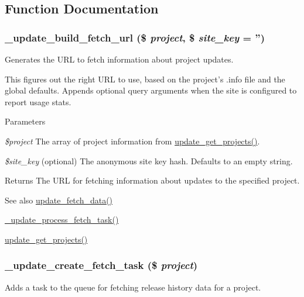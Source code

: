 \subsection{Function Documentation}
\hypertarget{update_8fetch_8inc_a6d937d41a6ccf645109deefae0f6e5d3}{
\subsubsection[{\_\-update\_\-build\_\-fetch\_\-url}]{\setlength{\rightskip}{0pt plus 5cm}\_\-update\_\-build\_\-fetch\_\-url (\$ {\em project}, \/  \$ {\em site\_\-key} = {\ttfamily ''})}}
\label{update_8fetch_8inc_a6d937d41a6ccf645109deefae0f6e5d3}
Generates the URL to fetch information about project updates.

This figures out the right URL to use, based on the project's .info file and the global defaults. Appends optional query arguments when the site is configured to report usage stats.


\begin{DoxyParams}{Parameters}
\item[{\em \$project}]The array of project information from \hyperlink{update_8compare_8inc_a7e1ea49d91f2d2b81b8101d481d10300}{update\_\-get\_\-projects()}. \item[{\em \$site\_\-key}](optional) The anonymous site key hash. Defaults to an empty string.\end{DoxyParams}
\begin{DoxyReturn}{Returns}
The URL for fetching information about updates to the specified project.
\end{DoxyReturn}
\begin{DoxySeeAlso}{See also}
\hyperlink{update_8module_a88528fa85108af5a0b26ab5b1d6fa8c2}{update\_\-fetch\_\-data()} 

\hyperlink{update_8fetch_8inc_a49b627a7dcb3c714f088bc0e7ef40e85}{\_\-update\_\-process\_\-fetch\_\-task()} 

\hyperlink{update_8compare_8inc_a7e1ea49d91f2d2b81b8101d481d10300}{update\_\-get\_\-projects()} 
\end{DoxySeeAlso}
\hypertarget{update_8fetch_8inc_a8b22762aaa27e7a0927f4f3ad09ad5e1}{
\subsubsection[{\_\-update\_\-create\_\-fetch\_\-task}]{\setlength{\rightskip}{0pt plus 5cm}\_\-update\_\-create\_\-fetch\_\-task (\$ {\em project})}}
\label{update_8fetch_8inc_a8b22762aaa27e7a0927f4f3ad09ad5e1}
Adds a task to the queue for fetching release history data for a project.

